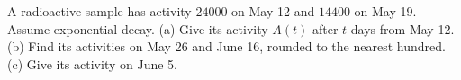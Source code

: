 A radioactive sample has activity $24000$ on May 12 and $14400$ on May 19. Assume exponential decay. (a) Give its activity $A(t)$ after $t$ days from May 12. (b) Find its activities on May 26 and June 16, rounded to the nearest hundred. (c) Give its activity on June 5.

